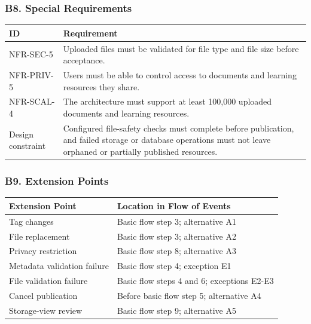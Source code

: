 \documentclass[12pt]{article}
\renewcommand{\baselinestretch}{1.5}
\begin{document}
\hypertarget{sec:b8-special-requirements}{}
\subsubsection*{B8. Special Requirements}
\par\medskip

\begingroup
\small
\renewcommand{\baselinestretch}{1.0}\selectfont
\renewcommand{\arraystretch}{1.15}
\setlength{\tabcolsep}{6pt}
\begin{longtable}{|>{\raggedright\arraybackslash}p{}|>{\raggedright\arraybackslash}p{}|}
\hline
\textbf{ID} & \textbf{Requirement} \\ \hline
\endhead
NFR-SEC-5 & Uploaded files must be validated for file type and file size before acceptance. \\ \hline
NFR-PRIV-5 & Users must be able to control access to documents and learning resources they share. \\ \hline
NFR-SCAL-4 & The architecture must support at least 100,000 uploaded documents and learning resources. \\ \hline
Design constraint & Configured file-safety checks must complete before publication, and failed storage or database operations must not leave orphaned or partially published resources. \\ \hline
\end{longtable}
\endgroup
\par\medskip

\hypertarget{sec:b9-extension-points}{}
\subsubsection*{B9. Extension Points}
\par\medskip

\begingroup
\small
\renewcommand{\baselinestretch}{1.0}\selectfont
\renewcommand{\arraystretch}{1.15}
\setlength{\tabcolsep}{6pt}
\begin{longtable}{|>{\raggedright\arraybackslash}p{}|>{\raggedright\arraybackslash}p{}|}
\hline
\textbf{Extension Point} & \textbf{Location in Flow of Events} \\ \hline
\endhead
Tag changes & Basic flow step 3; alternative A1 \\ \hline
File replacement & Basic flow step 3; alternative A2 \\ \hline
Privacy restriction & Basic flow step 8; alternative A3 \\ \hline
Metadata validation failure & Basic flow step 4; exception E1 \\ \hline
File validation failure & Basic flow steps 4 and 6; exceptions E2-E3 \\ \hline
Cancel publication & Before basic flow step 5; alternative A4 \\ \hline
Storage-view review & Basic flow step 9; alternative A5 \\ \hline
\end{longtable}
\endgroup
\par\medskip
\end{document}
